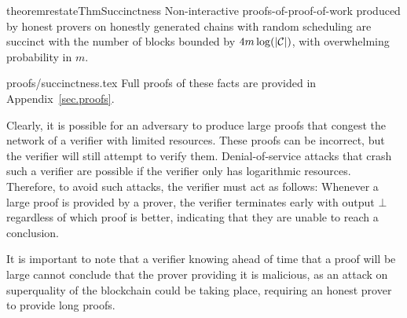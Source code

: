 \begin{restatable}{theorem}{restateThmSuccinctness}
    \label{thm.succinctness}
    Non-interactive proofs-of-proof-of-work produced by honest provers on
    honestly generated chains with random scheduling are succinct with the
    number of blocks bounded by $4m \log(|\mathcal{C}|)$, with overwhelming
    probability in $m$.
\end{restatable}

\ifonecolumn
{proofs/succinctness.tex}
\else
Full proofs of these facts are provided in Appendix~\ref{sec.proofs}.
\fi

\begin{remark}
Clearly, it is possible for an adversary to produce large proofs that congest
the network of a verifier with limited resources. These proofs can be incorrect,
but the verifier will still attempt to verify them. Denial-of-service attacks
that crash such a verifier are possible if the verifier only has logarithmic
resources. Therefore, to avoid such attacks, the verifier must act as follows:
Whenever a large proof is provided by a prover, the verifier terminates early
with output $\bot$ regardless of which proof is better, indicating that they are
unable to reach a conclusion.

It is important to note that a verifier knowing ahead of time that a proof will
be large cannot conclude that the prover providing it is malicious, as an attack
on superquality of the blockchain could be taking place, requiring an honest
prover to provide long proofs.
\end{remark}
